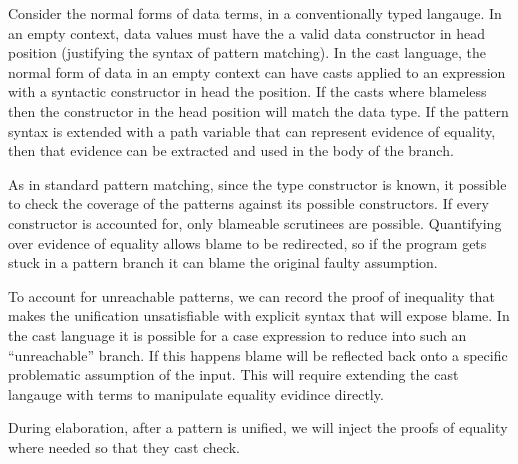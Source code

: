 Consider the normal forms of data terms, in a conventionally typed langauge.
In an empty context, data values must have the a valid data constructor in head position (justifying the syntax of pattern matching).
In the cast language, the normal form of data in an empty context can have casts applied to an expression with a syntactic constructor in head the position.
If the casts where blameless then the constructor in the head position will match the data type.
If the pattern syntax is extended with a path variable that can represent evidence of equality, then that evidence can be extracted and used in the body of the branch.

As in standard pattern matching, since the type constructor is known, it possible to check the coverage of the patterns against its possible constructors.
If every constructor is accounted for, only blameable scrutinees are possible.
Quantifying over evidence of equality allows blame to be redirected, so if the program gets stuck in a pattern branch it can blame the original faulty assumption.

To account for unreachable patterns, we can record the proof of inequality that makes the unification unsatisfiable with explicit syntax that will expose blame.
In the cast language it is possible for a case expression to reduce into such an ``unreachable'' branch.
If this happens blame will be reflected back onto a specific problematic assumption of the input.
This will require extending the cast langauge with terms to manipulate equality evidince directly.


During elaboration, after a pattern is unified, we will inject the proofs of equality where needed so that they cast check.



% 
% 
% 

